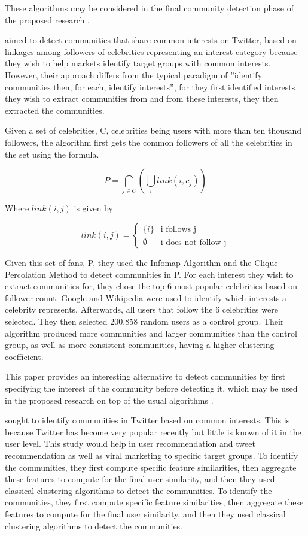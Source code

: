 These algorithms may be considered in the final community detection phase of the proposed research \cite{Tang:2010}.

 aimed to detect communities that share common interests on Twitter, based on linkages among followers of celebrities representing an interest category because they wish to help markets identify target groups with common interests. However, their approach differs from the typical  paradigm of ''identify communities then, for each, identify interests'', for they first identified interests they wish to extract communities from and from these interests, they then extracted the communities. 

Given a set of celebrities, C, celebrities being users with more than ten thousand followers, the algorithm first gets the common followers of all the celebrities in the set using the formula. 

\begin{equation}
P = \bigcap_{j \in C} (\bigcup_i link(i,c_j))
\end{equation}

Where $link(i,j)$ is given by

\begin{equation}
link(i,j) = \begin{cases}
\{i\} & \text{i follows j} \\
\emptyset & \text{i does not follow j}
\end{cases}
\end{equation}

Given this set of fans, P, they used the Infomap Algorithm and the Clique Percolation Method to detect communities in P. For each interest they wish to extract communities for, they chose the top 6 most popular celebrities based on follower count. Google and Wikipedia were used to identify which interests a celebrity represents. Afterwards, all users that follow the 6 celebrities were selected. They then selected 200,858 random users as a control group. Their algorithm produced more communities and larger communities than the control group, as well as more consistent communities, having a higher clustering coefficient. 

This paper provides an interesting alternative to detect communities by first specifying the interest of the community before detecting it, which may be used in the proposed research on top of the usual algorithms \cite{Lim:2012:1}.


 sought to identify communities in Twitter based on common interests. This is because Twitter has become very popular recently but little is known of it in the user level. This study would help in user recommendation and tweet recommendation as well as viral marketing to specific target groups. To identify the communities, they first compute specific feature similarities, then aggregate these features to compute for the final user similarity, and then they used classical clustering algorithms to detect the communities. To identify the communities, they first compute specific feature similarities, then aggregate these features to compute for the final user similarity, and then they used classical clustering algorithms to detect the communities.

